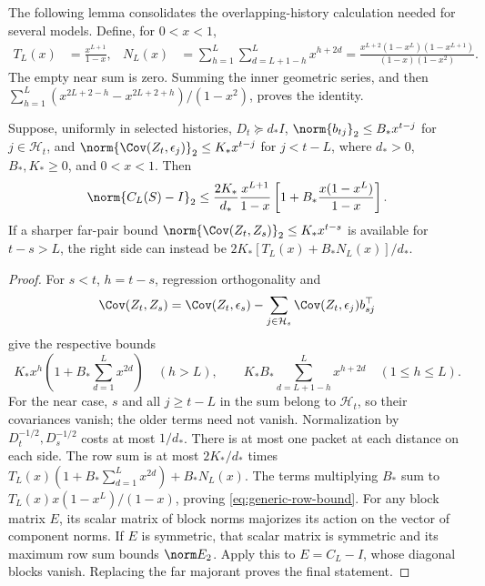 The following lemma consolidates the overlapping-history calculation needed
for several models. Define, for $0<x<1$,
\begin{align}
 T_L(x)&=\frac{x^{L+1}}{1-x},&
 N_L(x)&=\sum_{h=1}^L\sum_{d=L+1-h}^L x^{h+2d}
 =\frac{x^{L+2}(1-x^L)(1-x^{L+1})}{(1-x)(1-x^2)}.
 \label{eq:tail-near}
\end{align}
The empty near sum is zero. Summing the inner geometric series, and then
$\sum_{h=1}^L(x^{2L+2-h}-x^{2L+2+h})/(1-x^2)$, proves the identity.

\begin{lemma}
\label{lem:local-row}
Suppose, uniformly in selected histories,
$D_t\succeq d_* I$, $\norm{b_{tj}}_2\le B_*x^{t-j}$ for
$j\in\mathcal H_t$, and
$\norm{\Cov(Z_t,\epsilon_j)}_2\le K_*x^{t-j}$ for $j<t-L$,
where $d_*>0$, $B_*,K_*\ge0$, and $0<x<1$. Then
\begin{equation}
 \norm{C_L(S)-I}_2\le
 \frac{2K_*}{d_*}\frac{x^{L+1}}{1-x}
 \left[1+B_*\frac{x(1-x^L)}{1-x}\right].
 \label{eq:generic-row-bound}
\end{equation}
If a sharper far-pair bound
$\norm{\Cov(Z_t,Z_s)}_2\le K_*x^{t-s}$ is available for $t-s>L$,
the right side can instead be
$2K_*[T_L(x)+B_*N_L(x)]/d_*$.
\end{lemma}
\begin{proof}
For $s<t$, $h=t-s$, regression orthogonality and
\begin{equation}
 \Cov(Z_t,Z_s)=\Cov(Z_t,\epsilon_s)
 -\sum_{j\in\mathcal H_s}\Cov(Z_t,\epsilon_j)b_{sj}^\top
 \label{eq:residual-pair-identity}
\end{equation}
give the respective bounds
\[
 K_*x^h\left(1+B_*\sum_{d=1}^Lx^{2d}\right)\quad(h>L),\qquad
 K_*B_*\sum_{d=L+1-h}^Lx^{h+2d}\quad(1\le h\le L).
\]
For the near case, $s$ and all $j\ge t-L$ in the sum belong to
$\mathcal H_t$, so their covariances vanish; the older terms need not vanish.
Normalization by $D_t^{-1/2},D_s^{-1/2}$ costs at most $1/d_*$.
There is at most one packet at each distance on each side. The row sum is
at most $2K_*/d_*$ times
$T_L(x)(1+B_*\sum_{d=1}^Lx^{2d})+B_*N_L(x)$.
The terms multiplying $B_*$ sum to
$T_L(x)x(1-x^L)/(1-x)$, proving \eqref{eq:generic-row-bound}.
For any block matrix $E$, its scalar matrix of block norms majorizes
its action on the vector of component norms. If $E$ is symmetric, that
scalar matrix is symmetric and its maximum row sum bounds $\norm E_2$.
Apply this to $E=C_L-I$, whose diagonal blocks vanish. Replacing the far
majorant proves the final statement.
\end{proof}

